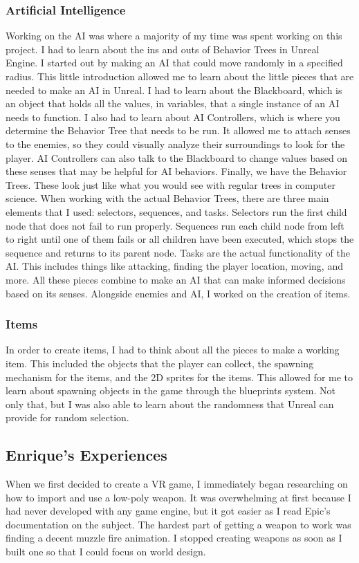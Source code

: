 \documentclass{sigchi}
\begin{document}
\subsubsection*{Artificial Intelligence} Working on the AI was where a majority of my time was spent working on this project. I had to learn about the ins and outs of Behavior Trees in Unreal Engine. I started out by making an AI that could move randomly in a specified radius. This little introduction allowed me to learn about the little pieces that are needed to make an AI in Unreal. I had to learn about the Blackboard, which is an object that holds all the values, in variables, that a single instance of an AI needs to function. I also had to learn about AI Controllers, which is where you determine the Behavior Tree that needs to be run. It allowed me to attach senses to the enemies, so they could visually analyze their surroundings to look for the player. AI Controllers can also talk to the Blackboard to change values based on these senses that may be helpful for AI behaviors. Finally, we have the Behavior Trees. These look just like what you would see with regular trees in computer science. When working with the actual Behavior Trees, there are three main elements that I used: selectors, sequences, and tasks. Selectors run the first child node that does not fail to run properly. Sequences run each child node from left to right until one of them fails or all children have been executed, which stops the sequence and returns to its parent node. Tasks are the actual functionality of the AI. This includes things like attacking, finding the player location, moving, and more. All these pieces combine to make an AI that can make informed decisions based on its senses. Alongside enemies and AI, I worked on the creation of items. 
\subsubsection*{Items} In order to create items, I had to think about all the pieces to make a working item. This included the objects that the player can collect, the spawning mechanism for the items, and the 2D sprites for the items. This allowed for me to learn about spawning objects in the game through the blueprints system. Not only that, but I was also able to learn about the randomness that Unreal can provide for random selection.

\subsection*{Enrique's Experiences}
When we first decided to create a VR game, I immediately began researching on how to import and use a low-poly weapon. It was overwhelming at first because I had never developed with any game engine, but it got easier as I read Epic's documentation on the subject. The hardest part of getting a weapon to work was finding a decent muzzle fire animation. I stopped creating weapons as soon as I built one so that I could focus on world design.
\end{document}
